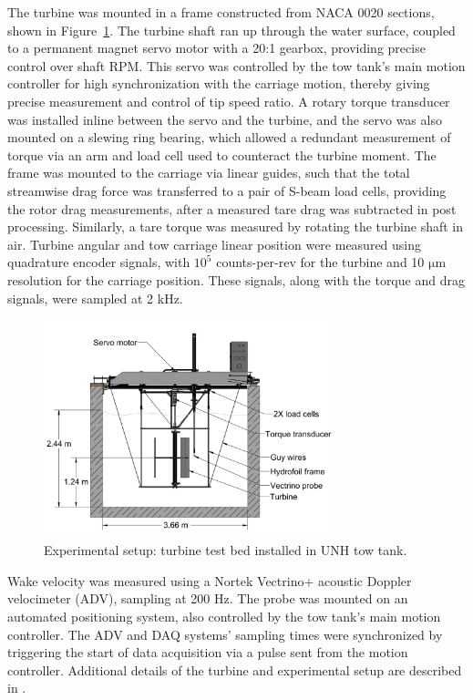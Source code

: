 \documentclass[energies,article,accept,moreauthors,pdftex,12pt,a4paper]{mdpi}
\begin{document}
The turbine was mounted in a frame constructed from NACA 0020 sections, shown in
Figure~\ref{fig:exp-setup}. The turbine shaft ran up through the water surface,
coupled to a permanent magnet servo motor with a 20:1 gearbox, providing precise
control over shaft RPM. This servo was controlled by the tow tank's main motion
controller for high synchronization with the carriage motion, thereby giving
precise measurement and control of tip speed ratio. A rotary torque transducer
was installed inline between the servo and the turbine, and the servo was also
mounted on a slewing ring bearing, which allowed a redundant measurement of
torque via an arm and load cell used to counteract the turbine moment. The frame
was mounted to the carriage via linear guides, such that the total streamwise
drag force was transferred to a pair of S-beam load cells, providing the rotor
drag measurements, after a measured tare drag was subtracted in post processing.
Similarly, a tare torque was measured by rotating the turbine shaft in air.
Turbine angular and tow carriage linear position were measured using quadrature
encoder signals, with $10^5$ counts-per-rev for the turbine and 10 $\mathrm{\mu
    m}$ resolution for the carriage position. These signals, along with the torque
and drag signals, were sampled at 2 kHz.

\begin{figure}[ht!]
\centering
\includegraphics[width=0.75\textwidth]{figures/exp_setup_drawing}
\caption{Experimental setup: turbine test bed installed in UNH tow tank.}
\label{fig:exp-setup}
\end{figure}

Wake velocity was measured using a Nortek Vectrino+ acoustic Doppler velocimeter
(ADV), sampling at 200 Hz. The probe was mounted on an automated positioning
system, also controlled by the tow tank's main motion controller. The ADV and
DAQ systems' sampling times were synchronized by triggering the start of data
acquisition via a pulse sent from the motion controller. Additional details of
the turbine and experimental setup are described in \cite{Bachant2015-JoT}.
\end{document}
